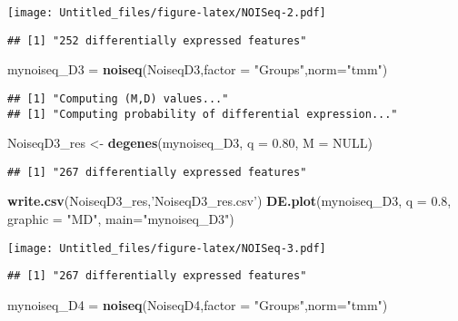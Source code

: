 \documentclass[]{article}
\newenvironment{Shaded}{\begin{snugshade}}{\end{snugshade}}
\newcommand{\DataTypeTok}[1]{\textcolor[rgb]{0.13,0.29,0.53}{#1}}
\newcommand{\FloatTok}[1]{\textcolor[rgb]{0.00,0.00,0.81}{#1}}
\newcommand{\KeywordTok}[1]{\textcolor[rgb]{0.13,0.29,0.53}{\textbf{#1}}}
\newcommand{\NormalTok}[1]{#1}
\newcommand{\OtherTok}[1]{\textcolor[rgb]{0.56,0.35,0.01}{#1}}
\newcommand{\StringTok}[1]{\textcolor[rgb]{0.31,0.60,0.02}{#1}}
\begin{document}
\texttt{[image: Untitled\_files/figure-latex/NOISeq-2.pdf]}

\begin{verbatim}
## [1] "252 differentially expressed features"
\end{verbatim}

\begin{Shaded}
\begin{Highlighting}[]
\NormalTok{mynoiseq_D3 =}\StringTok{ }\KeywordTok{noiseq}\NormalTok{(NoiseqD3,}\DataTypeTok{factor =} \StringTok{"Groups"}\NormalTok{,}\DataTypeTok{norm=}\StringTok{"tmm"}\NormalTok{)}
\end{Highlighting}
\end{Shaded}

\begin{verbatim}
## [1] "Computing (M,D) values..."
## [1] "Computing probability of differential expression..."
\end{verbatim}

\begin{Shaded}
\begin{Highlighting}[]
\NormalTok{NoiseqD3_res <-}\StringTok{ }\KeywordTok{degenes}\NormalTok{(mynoiseq_D3, }\DataTypeTok{q =} \FloatTok{0.80}\NormalTok{, }\DataTypeTok{M =} \OtherTok{NULL}\NormalTok{)}
\end{Highlighting}
\end{Shaded}

\begin{verbatim}
## [1] "267 differentially expressed features"
\end{verbatim}

\begin{Shaded}
\begin{Highlighting}[]
\KeywordTok{write.csv}\NormalTok{(NoiseqD3_res,}\StringTok{'NoiseqD3_res.csv'}\NormalTok{)}
\KeywordTok{DE.plot}\NormalTok{(mynoiseq_D3, }\DataTypeTok{q =} \FloatTok{0.8}\NormalTok{, }\DataTypeTok{graphic =} \StringTok{"MD"}\NormalTok{, }\DataTypeTok{main=}\StringTok{"mynoiseq_D3"}\NormalTok{)}
\end{Highlighting}
\end{Shaded}

\texttt{[image: Untitled\_files/figure-latex/NOISeq-3.pdf]}

\begin{verbatim}
## [1] "267 differentially expressed features"
\end{verbatim}

\begin{Shaded}
\begin{Highlighting}[]
\NormalTok{mynoiseq_D4 =}\StringTok{ }\KeywordTok{noiseq}\NormalTok{(NoiseqD4,}\DataTypeTok{factor =} \StringTok{"Groups"}\NormalTok{,}\DataTypeTok{norm=}\StringTok{"tmm"}\NormalTok{)}
\end{Highlighting}
\end{Shaded}
\end{document}

